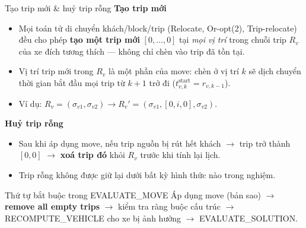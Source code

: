 \documentclass[aspectratio=169]{beamer}
\newcommand{\hl}[1]{\textcolor{blue!60!black}{\textbf{#1}}}
\begin{document}
\begin{frame}{Tạo trip mới \& huỷ trip rỗng}
  \textbf{Tạo trip mới}
  \begin{itemize}
    \item Mọi toán tử di chuyển khách/block/trip (Relocate, Or-opt(2), Trip-relocate) đều cho phép \hl{tạo một trip mới} $[0, \ldots, 0]$ tại \emph{mọi vị trí} trong chuỗi trip $R_v$ của xe đích tương thích — không chỉ chèn vào trip đã tồn tại.
    \item Vị trí trip mới trong $R_v$ là một phần của move: chèn ở vị trí $k$ sẽ dịch chuyển thời gian bắt đầu mọi trip từ $k{+}1$ trở đi ($t^{\text{start}}_{v,k} = r_{v,k-1}$).
    \item Ví dụ: $R_v = (\sigma_{v1}, \sigma_{v2}) \to R_v' = (\sigma_{v1}, [0,i,0], \sigma_{v2})$.
  \end{itemize}

  \vspace{1mm}
  \textbf{Huỷ trip rỗng}
  \begin{itemize}
    \item Sau khi áp dụng move, nếu trip nguồn bị rút hết khách $\to$ trip trở thành $[0,0]$ $\to$ \hl{xoá trip đó} khỏi $R_v$ trước khi tính lại lịch.
    \item Trip rỗng không được giữ lại dưới bất kỳ hình thức nào trong nghiệm.
  \end{itemize}

  \vspace{1mm}
  \begin{alertblock}{Thứ tự bắt buộc trong EVALUATE\_MOVE}
    \small Áp dụng move (bản sao) $\to$ \hl{remove all empty trips} $\to$ kiểm tra ràng buộc cấu trúc $\to$ RECOMPUTE\_VEHICLE cho xe bị ảnh hưởng $\to$ EVALUATE\_SOLUTION.
  \end{alertblock}
\end{frame}
\end{document}
